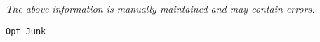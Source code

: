 \label{pkg:opt\_junk}

{\tiny \it The above information is manually maintained and may contain errors.}
\begin{verbatim}
Opt_Junk
\end{verbatim}
